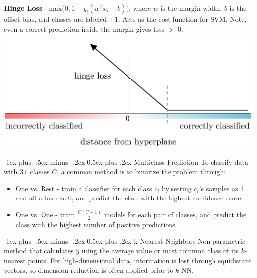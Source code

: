 \documentclass[10pt,landscape]{article}
\makeatletter
\newcommand{\plus}{\raisebox{.3\height}{\scalebox{.7}{+}}}
\renewcommand{\section}{\@startsection{section}{1}{0mm}%
                                {-1ex plus -.5ex minus -.2ex}%
                                {0.5ex plus .2ex}%
                                {\normalfont\large\bfseries}}
\renewcommand{\subsection}{\@startsection{subsection}{2}{0mm}%
                                {-1ex plus -.5ex minus -.2ex}%
                                {0.5ex plus .2ex}%
                                {\normalfont\normalsize\bfseries}}
\makeatother
\begin{document}
\begin{multicols}{3}
    \textbf{Hinge Loss} - max($0,1-y_i(w^T x_i - b)$), where
    $w$ is the margin width, $b$ is the offset bias, and classes are labeled $\pm1$. Acts as the cost function for SVM. Note, even a correct prediction inside the margin gives loss $>$ 0.
    \vspace{-1mm}
    \begin{center}
        \includegraphics[scale = .105]{images/hingeloss3.JPG}
    \end{center}
    \vspace{-3.5mm}
    \subsection{Multiclass Prediction}
    To classify data with 3$\plus$ classes $C$, a common method is to binarize the problem through:
    \begin{itemize}[label={--},leftmargin=4mm]
        \vspace{-1mm}
        \itemsep -.4mm
        \item One vs. Rest - train a classifier for each class $c_i$ by setting $c_i$'s samples as 1 and all others as 0, and predict the class with the highest confidence score
        \item One vs. One - train $\frac{C (C-1)}{2}$ models for each pair of classes, and predict the class with the highest number of positive predictions
    \end{itemize}

    \section{k-Nearest Neighbors}
    Non-parametric method that calculates $\hat{y}$ using the average value or most common class of its $k$-nearest points. For high-dimensional data, information is lost through equidistant vectors, so dimension reduction is often applied prior to $k$-NN.


\end{multicols}
\end{document}
